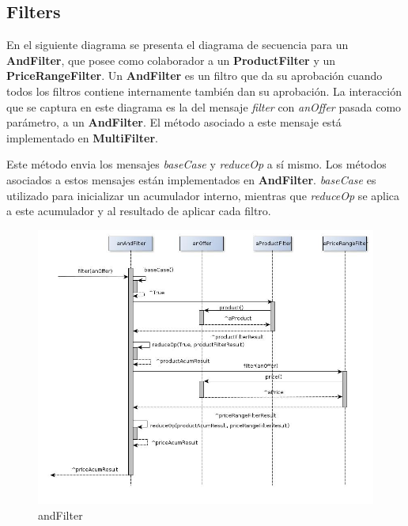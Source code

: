 \documentclass[10pt, a4paper]{article}
\begin{document}
\subsection{Filters}

En el siguiente diagrama se presenta el diagrama de secuencia para un \textbf{AndFilter}, que posee como colaborador a un \textbf{ProductFilter} y un \textbf{PriceRangeFilter}. Un \textbf{AndFilter} es un filtro que da su aprobación cuando todos los filtros contiene internamente también dan su aprobación. La interacción que se captura en este diagrama es la del mensaje \emph{filter} con \emph{anOffer} pasada como parámetro, a un \textbf{AndFilter}. El método asociado a este mensaje está implementado en \textbf{MultiFilter}. 

 Este método envia los mensajes \emph{baseCase} y \emph{reduceOp} a sí mismo. Los métodos asociados a estos mensajes están implementados en \textbf{AndFilter}. \emph{baseCase} es utilizado para inicializar un acumulador interno, mientras que \emph{reduceOp} se aplica a este acumulador y al resultado de aplicar cada filtro.
\begin{figure}[H]
\centering
\includegraphics[scale=0.55]{graphics/andFilter_sequence.jpg}
\caption{andFilter}
\end{figure}
 
% 
\newpage
\end{document}
